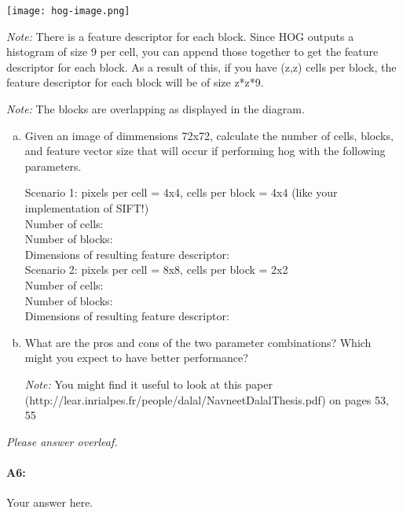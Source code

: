 \texttt{[image: hog-image.png]}

\emph{Note:} There is a feature descriptor for each block. Since HOG outputs a histogram of size 9 per cell, you can append those together to get the feature descriptor for each block. As a result of this, if you have (z,z) cells per block, the feature descriptor for each block will be of size z*z*9.

\emph{Note:} The blocks are overlapping as displayed in the diagram.

\begin{enumerate}[(a)]
\item Given an image of dimmensions 72x72, calculate the number of cells, blocks, and feature vector size that will occur if performing hog with the following parameters.

Scenario 1: pixels per cell = 4x4, cells per block = 4x4 (like your implementation of SIFT!)
\\ 
Number of cells: 
\\
Number of blocks: 
\\
Dimensions of resulting feature descriptor: 
\\

Scenario 2: pixels per cell = 8x8, cells per block = 2x2
\\ 
Number of cells:
\\
Number of blocks: 
\\
Dimensions of resulting feature descriptor: 


\item What are the pros and cons of the two parameter combinations? Which might you expect to have better performance?

\emph{Note:} You might find it useful to look at this paper (http://lear.inrialpes.fr/people/dalal/NavneetDalalThesis.pdf) on pages 53, 55
\end{enumerate}

\emph{Please answer overleaf.}

\pagebreak
\paragraph{A6:} Your answer here.



